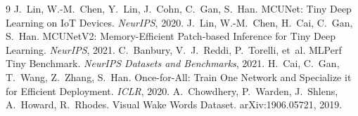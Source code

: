 \documentclass[10pt,letterpaper]{article}
\begin{document}
\begin{thebibliography}{9}\small
{} J.~Lin, W.-M.~Chen, Y.~Lin, J.~Cohn, C.~Gan, S.~Han. MCUNet: Tiny Deep Learning on IoT Devices. \emph{NeurIPS}, 2020.
 J.~Lin, W.-M.~Chen, H.~Cai, C.~Gan, S.~Han. MCUNetV2: Memory-Efficient Patch-based Inference for Tiny Deep Learning. \emph{NeurIPS}, 2021.
 C.~Banbury, V.~J.~Reddi, P.~Torelli, et~al. MLPerf Tiny Benchmark. \emph{NeurIPS Datasets and Benchmarks}, 2021.
 H.~Cai, C.~Gan, T.~Wang, Z.~Zhang, S.~Han. Once-for-All: Train One Network and Specialize it for Efficient Deployment. \emph{ICLR}, 2020.
 A.~Chowdhery, P.~Warden, J.~Shlens, A.~Howard, R.~Rhodes. Visual Wake Words Dataset. arXiv:1906.05721, 2019.
\end{thebibliography}
\end{document}
